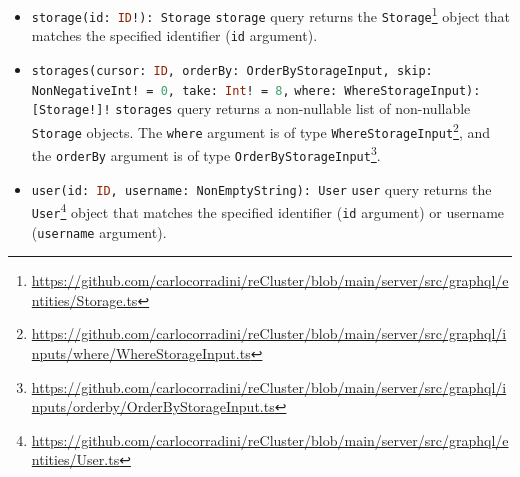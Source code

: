 \begin{itemize}
  \item \lstinline[language=graphql, morekeywords={[2]{Storage}}, morekeywords={[4]{id}},
    morekeywords={[5]{storage}}]{storage(id: ID!): Storage}
    \newline
    \texttt{storage} query returns the \texttt{Storage}\footnote{\url{https://github.com/carlocorradini/reCluster/blob/main/server/src/graphql/entities/Storage.ts}}
    object that matches the specified identifier (\texttt{id} argument).

  \item \lstinline[language=graphql, morekeywords={[2]{Storage, OrderByStorageInput, NonNegativeInt, WhereStorageInput}},
    morekeywords={[4]{cursor, orderBy, skip, take, where}}, morekeywords={[5]{storages}}]{storages(cursor: ID, orderBy: OrderByStorageInput, skip: NonNegativeInt! = 0, take: Int! = 8,}
    \newline
    \hphantom{---------------}\lstinline[language=graphql, morekeywords={[2]{Storage, OrderByStorageInput, NonNegativeInt, WhereStorageInput}},
    morekeywords={[4]{cursor, orderBy, skip, take, where}}, morekeywords={[5]{storages}}]{where: WhereStorageInput): [Storage!]!}
    \newline
    \texttt{storages} query returns a non-nullable list of non-nullable \texttt{Storage}
    objects.
    \newline
    The \texttt{where} argument is of type \texttt{WhereStorageInput}\footnote{\url{https://github.com/carlocorradini/reCluster/blob/main/server/src/graphql/inputs/where/WhereStorageInput.ts}},
    and the \texttt{orderBy} argument is of type \texttt{OrderByStorageInput}\footnote{\url{https://github.com/carlocorradini/reCluster/blob/main/server/src/graphql/inputs/orderby/OrderByStorageInput.ts}}.

  \item \lstinline[language=graphql, morekeywords={[2]{User, NonEmptyString}}, morekeywords={[4]{id, username}},
    morekeywords={[5]{user}}]{user(id: ID, username: NonEmptyString): User}
    \newline
    \texttt{user} query returns the \texttt{User}\footnote{\url{https://github.com/carlocorradini/reCluster/blob/main/server/src/graphql/entities/User.ts}}
    object that matches the specified identifier (\texttt{id} argument) or username
    (\texttt{username} argument).


\end{itemize}
